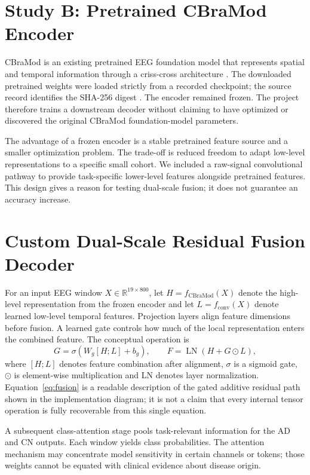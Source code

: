 \section{Study B: Pretrained CBraMod Encoder}
CBraMod is an existing pretrained EEG foundation model that represents spatial and temporal information through a criss-cross architecture \cite{wang2025cbramod}. The downloaded pretrained weights were loaded strictly from a recorded checkpoint; the source record identifies the SHA-256 digest \texttt{}. The encoder remained frozen. The project therefore trains a downstream decoder without claiming to have optimized or discovered the original CBraMod foundation-model parameters.

The advantage of a frozen encoder is a stable pretrained feature source and a smaller optimization problem. The trade-off is reduced freedom to adapt low-level representations to a specific small cohort. We included a raw-signal convolutional pathway to provide task-specific lower-level features alongside pretrained features. This design gives a reason for testing dual-scale fusion; it does not guarantee an accuracy increase.

\section{Custom Dual-Scale Residual Fusion Decoder}
For an input EEG window $X\in\mathbb{R}^{19\times800}$, let $H=f_{\mathrm{CBraMod}}(X)$ denote the high-level representation from the frozen encoder and let $L=f_{\mathrm{conv}}(X)$ denote learned low-level temporal features. Projection layers align feature dimensions before fusion. A learned gate controls how much of the local representation enters the combined feature. The conceptual operation is
\begin{equation}
G=\sigma\!\left(W_g[H;L]+b_g\right),\qquad
F=\operatorname{LN}\!\left(H+G\odot L\right),
\label{eq:fusion}
\end{equation}
where $[H;L]$ denotes feature combination after alignment, $\sigma$ is a sigmoid gate, $\odot$ is element-wise multiplication and LN denotes layer normalization. Equation~\ref{eq:fusion} is a readable description of the gated additive residual path shown in the implementation diagram; it is not a claim that every internal tensor operation is fully recoverable from this single equation.

A subsequent class-attention stage pools task-relevant information for the AD and CN outputs. Each window yields class probabilities. The attention mechanism may concentrate model sensitivity in certain channels or tokens; those weights cannot be equated with clinical evidence about disease origin.

